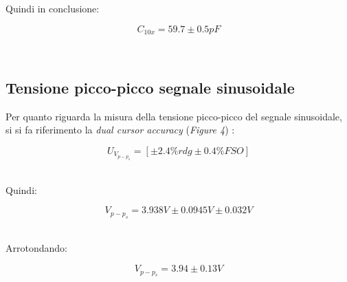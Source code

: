 \documentclass[a4paper]{article}
\begin{document}
Quindi in conclusione:
\begin{Large}
	\begin{equation}
		{C_{10x}}= 59.7 \pm0.5 pF
	\end{equation}
\end{Large}\\

\subsection{Tensione picco-picco segnale sinusoidale} 
Per quanto riguarda la misura della tensione picco-picco del segnale sinusoidale, si si fa riferimento la \emph{dual cursor accuracy} (\emph{Figure 4}) :

\begin{Large}
	\begin{equation}
		U_{V_{p-p_{s}}}= [\pm 2.4\% rdg\pm 0.4\%FSO]
	\end{equation}
\end{Large}\\

Quindi: 
\begin{Large}
	\begin{equation}
		V_{p-p_{s}}= 3.938V\pm 0.0945V\pm 0.032V
	\end{equation}
\end{Large}\\

Arrotondando:
\begin{Large}
	\begin{equation}
		V_{p-p_{s}}= 3.94\pm 0.13V
\end{equation}
\end{Large}\\
\end{document}
